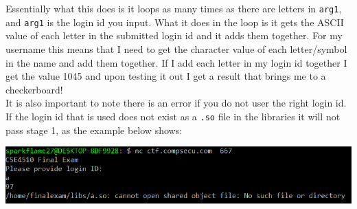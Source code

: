 \documentclass{article}
\newcommand\tab[1][.5cm]{\hspace*{#1}}
\begin{document}
	\tab Essentially what this does is it loops as many times as there are letters in \texttt{arg1}, and
	\texttt{arg1} is the login id you input. What it does in the loop is it gets the ASCII value of each
	letter in the submitted login id and it adds them together. For my username this means that I need to 
	get the character value of each letter/symbol in the name and add them together. If I add each letter in
	my login id together I get the value 1045 and upon testing it out I get a result that brings me to a checkerboard! \\
	\tab It is also important to note there is an error if you do not user the right login id. If the login 
	id that is used does not exist as a \texttt{.so} file in the libraries it will not pass stage 1, as the
	example below shows:
	\begin{center}
		\includegraphics[scale=0.6]{Stage1BadSo.png}
	\end{center}
	
\end{document}
